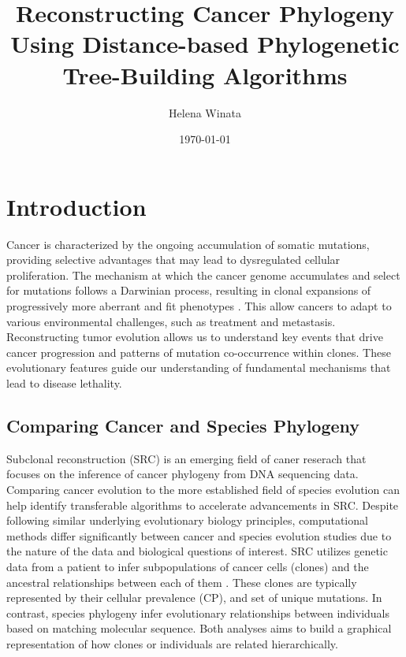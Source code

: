 \documentclass{article}
\title{Reconstructing Cancer Phylogeny Using Distance-based Phylogenetic Tree-Building Algorithms }
\author{Helena Winata}
\date{\today}
\begin{document}
\maketitle

\section{Introduction}
Cancer is characterized by the ongoing accumulation of somatic mutations, providing selective advantages that may lead to dysregulated cellular proliferation. The mechanism at which the cancer genome accumulates and select for mutations follows a Darwinian process, resulting in clonal expansions of progressively more aberrant and fit phenotypes \cite{Tarabichi2021,Liu2020}. This allow cancers to adapt to various environmental challenges, such as treatment and metastasis. Reconstructing tumor evolution allows us to understand key events that drive cancer progression and patterns of mutation co-occurrence within clones. These evolutionary features guide our understanding of fundamental mechanisms that lead to disease lethality. 

\subsection{Comparing Cancer and Species Phylogeny}
Subclonal reconstruction (SRC) is an emerging field of caner reserach that focuses on the inference of cancer phylogeny from DNA sequencing data. Comparing cancer evolution to the more established field of species evolution can help identify transferable algorithms to accelerate advancements in SRC. Despite following similar underlying evolutionary biology principles, computational methods differ significantly between cancer and species evolution studies due to the nature of the data and biological questions of interest. SRC utilizes genetic data from a patient to infer subpopulations of cancer cells (clones) and the ancestral relationships between each of them \cite{Liu2020,phyloWGS,pyclone}. These clones are typically represented by their cellular prevalence (CP), and set of unique mutations. In contrast, species phylogeny infer evolutionary relationships between individuals based on matching molecular sequence. Both analyses aims to build a graphical representation of how clones or individuals are related hierarchically.
\end{document}
